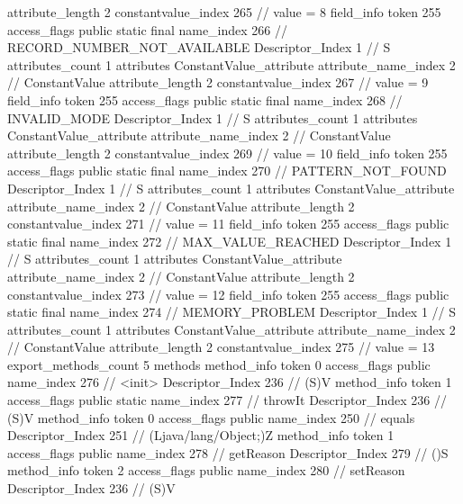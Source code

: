 {{{{{{{					attribute_length	2
					constantvalue_index	265		// value = 8
				}
				}
			}
			field_info {
				token	255
				access_flags	public static final
				name_index	266		// RECORD_NUMBER_NOT_AVAILABLE
				Descriptor_Index	1		// S
				attributes_count	1
				attributes {
				ConstantValue_attribute {
					attribute_name_index	2		// ConstantValue
					attribute_length	2
					constantvalue_index	267		// value = 9
				}
				}
			}
			field_info {
				token	255
				access_flags	public static final
				name_index	268		// INVALID_MODE
				Descriptor_Index	1		// S
				attributes_count	1
				attributes {
				ConstantValue_attribute {
					attribute_name_index	2		// ConstantValue
					attribute_length	2
					constantvalue_index	269		// value = 10
				}
				}
			}
			field_info {
				token	255
				access_flags	public static final
				name_index	270		// PATTERN_NOT_FOUND
				Descriptor_Index	1		// S
				attributes_count	1
				attributes {
				ConstantValue_attribute {
					attribute_name_index	2		// ConstantValue
					attribute_length	2
					constantvalue_index	271		// value = 11
				}
				}
			}
			field_info {
				token	255
				access_flags	public static final
				name_index	272		// MAX_VALUE_REACHED
				Descriptor_Index	1		// S
				attributes_count	1
				attributes {
				ConstantValue_attribute {
					attribute_name_index	2		// ConstantValue
					attribute_length	2
					constantvalue_index	273		// value = 12
				}
				}
			}
			field_info {
				token	255
				access_flags	public static final
				name_index	274		// MEMORY_PROBLEM
				Descriptor_Index	1		// S
				attributes_count	1
				attributes {
				ConstantValue_attribute {
					attribute_name_index	2		// ConstantValue
					attribute_length	2
					constantvalue_index	275		// value = 13
				}
				}
			}
			}
			export_methods_count	5
			methods {
				method_info {
					token	0
					access_flags	public
					name_index	276		// <init>
					Descriptor_Index	236		// (S)V
				}
				method_info {
					token	1
					access_flags	public static
					name_index	277		// throwIt
					Descriptor_Index	236		// (S)V
				}
				method_info {
					token	0
					access_flags	public
					name_index	250		// equals
					Descriptor_Index	251		// (Ljava/lang/Object;)Z
				}
				method_info {
					token	1
					access_flags	public
					name_index	278		// getReason
					Descriptor_Index	279		// ()S
				}
				method_info {
					token	2
					access_flags	public
					name_index	280		// setReason
					Descriptor_Index	236		// (S)V
				}
			}
		}
	}
}
